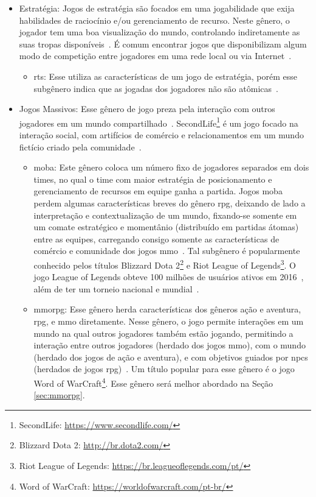 \begin{itemize}
  \item Estratégia: Jogos de estratégia são focados em uma jogabilidade que exija habilidades de raciocínio e/ou gerenciamento de recurso. Neste gênero, o jogador tem uma boa visualização do mundo, controlando indiretamente as suas tropas disponíveis~\cite{rollings2003andrew}. É comum encontrar jogos que disponibilizam algum modo de competição entre jogadores em uma rede local ou via Internet~\cite{adams_1208533}.
    \begin{itemize}
      \item \ac{rts}: Esse utiliza as características de um jogo de estratégia, porém esse subgênero indica que as jogadas dos jogadores não são atômicas~\cite{adams_1208533}.
    \end{itemize}
  \item Jogos Massivos: Esse gênero de jogo preza pela interação com outros jogadores em um mundo compartilhado~\cite{adams_1208533}. SecondLife\footnote{SecondLife: \url{https://www.secondlife.com/}} é um jogo focado na interação social, com artifícios de comércio e relacionamentos em um mundo fictício criado pela comunidade~\cite{tecmundo_secondlife}.
    \begin{itemize}
      \item \ac{moba}: Este gênero coloca um número fixo de jogadores separados em dois times, no qual o time com maior estratégia de posicionamento e gerenciamento de recursos em equipe ganha a partida. Jogos \ac{moba} perdem algumas características breves do gênero \ac{rpg}, deixando de lado a interpretação e contextualização de um mundo, fixando-se somente em um comate estratégico e momentânio (distribuído em partidas átomas) entre as equipes, carregando consigo somente as características de comércio e comunidade dos jogos \ac{mmo}~\cite{adams_1208533}. Tal subgênero é popularmente conhecido pelos títulos Blizzard Dota 2\footnote{Blizzard Dota 2: \url{http://br.dota2.com/}} e Riot League of Legends\footnote{Riot League of Legends: \url{https://br.leagueoflegends.com/pt/}}. O jogo League of Legends obteve 100 milhões de usuários ativos em 2016~\cite{lol_statista}, além de ter um torneio nacional e mundial~\cite{lol_sportv}.
      \item \ac{mmorpg}: Esse gênero herda características dos gêneros ação e aventura, \ac{rpg}, e \ac{mmo} diretamente. Nesse gênero, o jogo permite interações em um mundo na qual outros jogadores também estão jogando, permitindo a interação entre outros jogadores (herdado dos jogos \ac{mmo}), com o mundo (herdado dos jogos de ação e aventura), e com objetivos guiados por \ac{npcs} (herdados de jogos \ac{rpg})~\cite{adams_1208533}. Um título popular para esse gênero é o jogo Word of WarCraft\footnote{Word of WarCraft: \url{https://worldofwarcraft.com/pt-br/}}. Esse gênero será melhor abordado na Seção \ref{sec:mmorpg}.

\end{itemize}
\end{itemize}
